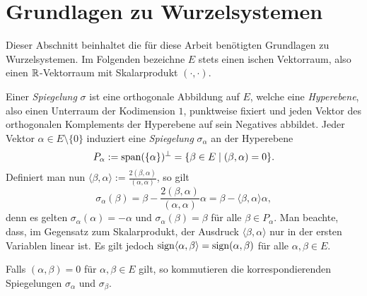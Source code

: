 \section{Grundlagen zu Wurzelsystemen}
\label{sec:grundlagen}

Dieser Abschnitt beinhaltet die für diese Arbeit benötigten Grundlagen zu Wurzelsystemen.  
Im Folgenden bezeichne $E$ stets einen \euklid ischen Vektorraum, also einen $\mathbb{R}$\hyp{}Vektorraum mit Skalarprodukt $(\cdot,\cdot)$.

Einer \emph{Spiegelung} $\sigma$ ist eine orthogonale Abbildung auf $E$, welche eine \emph{Hyperebene}, also einen Unterraum der Kodimension $1$, punktweise fixiert und jeden Vektor des orthogonalen Komplements der Hyperebene auf sein Negatives abbildet.
Jeder Vektor $\alpha \in E \setminus \{0\}$ induziert eine \emph{Spiegelung} $\sigma_\alpha$ an der Hyperebene 
\begin{displaymath}
  P_\alpha := \operatorname{span}(\{\alpha\})^\perp = \{\beta \in E \mid (\beta, \alpha) = 0\}.
\end{displaymath}
Definiert man nun $\langle \beta, \alpha \rangle := \tfrac{2 (\beta, \alpha)}{(\alpha, \alpha)}$, so gilt
\begin{displaymath}
  \label{eq:RF}
  \sigma_\alpha(\beta) 
  = \beta - \frac{2 (\beta, \alpha)}{(\alpha,\alpha)} \alpha 
  = \beta - \langle \beta, \alpha \rangle \alpha,\tag{RF}
\end{displaymath}
denn es gelten $\sigma_\alpha(\alpha) = -\alpha$ und $\sigma_\alpha(\beta) = \beta$ für alle $\beta \in P_\alpha$.
Man beachte, dass, im Gegensatz zum Skalarprodukt, der Ausdruck $\langle \beta, \alpha \rangle$ nur in der ersten Variablen linear ist.
Es gilt jedoch $\operatorname{sign} \langle \alpha, \beta \rangle = \operatorname{sign} (\alpha, \beta)$ für alle $\alpha, \beta \in E$.

\begin{lem}
  \label{lem:orthogonalRoots}
  Falls $(\alpha, \beta) = 0$ für $\alpha, \beta \in E$ gilt, so kommutieren die korrespondierenden Spiegelungen $\sigma_\alpha$ und $\sigma_\beta$.
\end{lem}

